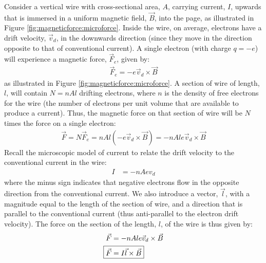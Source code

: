 Consider a vertical wire with cross-sectional area, $A$, carrying current, $I$, upwards that is immersed in a uniform magnetic field, $\vec B$, into the page, as illustrated in Figure \ref{fig:magneticforce:microforce}. Inside the wire, on average, electrons have a drift velocity, $\vec v_d$, in the downwards direction (since they move in the direction opposite to that of conventional current).
A single electron (with charge $q=-e$) will experience a magnetic force, $\vec F_e$, given by:
\begin{align*}
\vec F_e = -e \vec v_d \times \vec B
\end{align*}
as illustrated in Figure \ref{fig:magneticforce:microforce}. A section of wire of length, $l$, will contain $N=nAl$ drifting electrons, where $n$ is the density of free electrons for the wire (the number of electrons per unit volume that are available to produce a current). Thus, the magnetic force on that section of wire will be $N$ times the force on a single electron:
\begin{align*}
\vec F = N\vec F_e = nAl (-e \vec v_d \times \vec B)=-nAle \vec v_d \times \vec B
\end{align*}
Recall the microscopic model of current to relate the drift velocity to the conventional current in the wire:
\begin{align*}
I &= -nAev_d
\end{align*}
where the minus sign indicates that negative electrons flow in the opposite direction from the conventional current. We also introduce a vector, $\vec l$, with a magnitude equal to the length of the section of wire, and a direction that is parallel to the conventional current (thus anti-parallel to the electron drift velocity). The force on the section of the length, $l$, of the wire is thus given by:
\begin{align*}
\vec F &= -nAle \vec v_d \times \vec B\\
\Aboxed{ \vec F&= I \vec l \times \vec B}
\end{align*}
